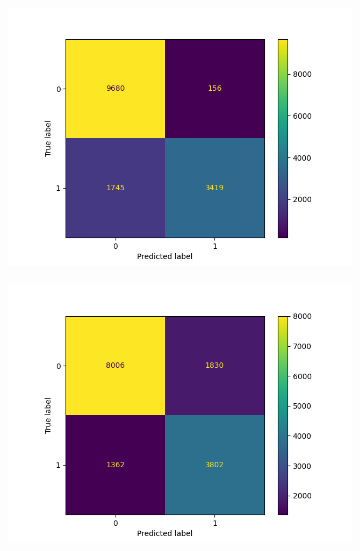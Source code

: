 \begin{figure}
\begin{subfigure}[b]{0.245\textwidth}
            \centering 
            \includegraphics[scale=0.35]{"../figs/fig_content_title/fig_ngram_2_LogisticRegression(solver='sag')__content_title.png"}
            \caption{}
        \end{subfigure}
        \begin{subfigure}[b]{0.245\textwidth}  
            \centering 
            \includegraphics[scale=0.35]{"../figs/fig_content_title/fig_ngramKNN_2k=1_content_title.png"}
            \caption{}
        \end{subfigure}
        \begin{subfigure}[b]{0.245\textwidth}
            \centering

\end{subfigure}
\end{figure}
